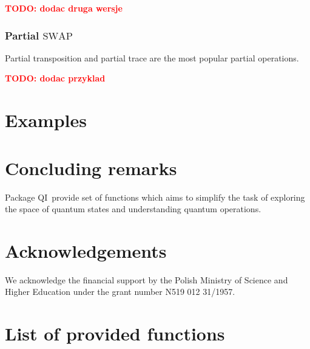 \documentclass[final,5p,times]{elsarticle}
\newcommand{\1}{{\rm 1\hspace{-0.9mm}l}}
\newcommand{\SWAP}{\ensuremath{\mathrm{SWAP}}}
\newcommand{\qi}{QI}
\newcommand{\todo}[1]{\textcolor{red}{\bf TODO: #1}}
\begin{document}
\todo{dodac druga wersje}

\subsubsection{Partial \SWAP}
Partial transposition and partial trace are the most popular partial operations.

\todo{dodac przyklad}

\section{Examples}\label{sec:examples}


\section{Concluding remarks}\label{sec:comclude}
Package \qi\ provide set of functions which aims to simplify the task of
exploring the space of quantum states and understanding quantum operations.

\section*{Acknowledgements}
We acknowledge the financial support by the Polish
Ministry of Science and Higher Education under the grant number N519 012
31/1957. 

\appendix
\section{List of provided functions}





\end{document}
